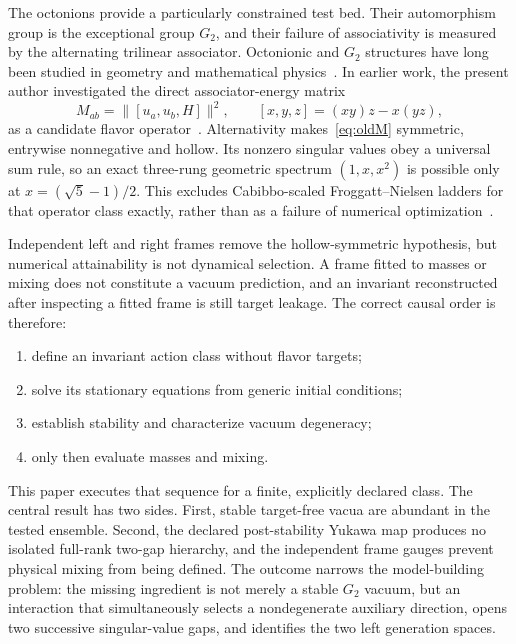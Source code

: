 \documentclass[11pt]{article}
\begin{document}
The octonions provide a particularly constrained test bed.  Their automorphism group is the exceptional group $G_2$, and their failure of associativity is measured by the alternating trilinear associator.  Octonionic and $G_2$ structures have long been studied in geometry and mathematical physics~\cite{Baez2002,Bryant1987}.  In earlier work, the present author investigated the direct associator-energy matrix
\begin{equation}
  M_{ab}=\lVert[u_a,u_b,H]\rVert^2,
  \qquad [x,y,z]=(xy)z-x(yz),
  \label{eq:oldM}
\end{equation}
as a candidate flavor operator~\cite{ConnellyObstruction2026,ConnellyWeighted2026,ConnellyGeometry2026}.  Alternativity makes~\eqref{eq:oldM} symmetric, entrywise nonnegative and hollow.  Its nonzero singular values obey a universal sum rule, so an exact three-rung geometric spectrum $(1,x,x^2)$ is possible only at $x=(\sqrt5-1)/2$.  This excludes Cabibbo-scaled Froggatt--Nielsen ladders for that operator class exactly, rather than as a failure of numerical optimization~\cite{ConnellyObstruction2026,ConnellyWeighted2026}.

Independent left and right frames remove the hollow-symmetric hypothesis, but numerical attainability is not dynamical selection.  A frame fitted to masses or mixing does not constitute a vacuum prediction, and an invariant reconstructed after inspecting a fitted frame is still target leakage.  The correct causal order is therefore:
\begin{enumerate}[label=(\roman*)]
  \item define an invariant action class without flavor targets;
  \item solve its stationary equations from generic initial conditions;
  \item establish stability and characterize vacuum degeneracy;
  \item only then evaluate masses and mixing.
\end{enumerate}

This paper executes that sequence for a finite, explicitly declared class.  The central result has two sides.  First, stable target-free vacua are abundant in the tested ensemble.  Second, the declared post-stability Yukawa map produces no isolated full-rank two-gap hierarchy, and the independent frame gauges prevent physical mixing from being defined.  The outcome narrows the model-building problem: the missing ingredient is not merely a stable $G_2$ vacuum, but an interaction that simultaneously selects a nondegenerate auxiliary direction, opens two successive singular-value gaps, and identifies the two left generation spaces.
\end{document}
